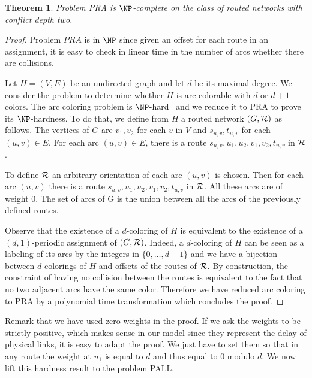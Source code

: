 \documentclass[10pt, conference, letterpaper]{IEEEtran}
\newtheorem{theorem}{Theorem}
\begin{document}
 \begin{theorem}
Problem PRA is $\NP$-complete on the class of routed networks with conflict depth two.
\end{theorem}
 \begin{proof}
 Problem $PRA$ is in $\NP$ since given an offset for each route in an assignment, it is easy to check in linear time in the number of arcs whether there are collisions.
 
  Let $H=(V,E)$ be an undirected graph and let $d$ be its maximal degree. We consider the problem to determine whether $H$ is arc-colorable
  with $d$ or $d+1$ colors. The arc coloring problem is $\NP$-hard~\cite{holyer1981np} and we reduce it to PRA to prove its $\NP$-hardness. To do that, we define from $H$ a routed network $(G,{\cal R})$ as follows.
  The vertices of $G$ are $v_1, v_2$ for each $v$ in $V$ and $s_{u,v}, t_{u,v}$ for each $(u,v) \in E$.
  For each arc $(u,v) \in E$, there is a route $s_{u,v},u_1,u_2,v_1,v_2,t_{u,v}$ in ${\cal R}$. 
  
   To define ${\cal R}$ an arbitrary orientation of each arc $(u,v)$ is chosen. 
   Then for each arc $(u,v)$ there is a route $s_{u,v},u_1,u_2,v_1,v_2,t_{u,v}$ in ${\cal R}$.
  All these arcs are of weight $0$. The set of arcs of G is the union between all the arcs of the previously defined routes.
   
    
  Observe that the existence of a $d$-coloring of $H$ is equivalent to the existence of a $(d,1)$-periodic assignment
  of $(G,{\cal R})$. Indeed, a $d$-coloring of $H$ can be seen as a labeling of its arcs by the integers
  in $\{0,\dots,d-1\}$ and we have a bijection between $d$-colorings of $H$ and offsets of the routes of ${\cal R}$.
  By construction, the constraint of having no collision between the routes is equivalent to the fact that no two adjacent arcs have the same color. Therefore we have reduced arc coloring to PRA by a polynomial time transformation which concludes the proof. 
 \end{proof}
 
 Remark that we have used zero weights in the proof. If we ask the weights to be strictly positive, which makes sense in our model since
they represent the delay of physical links, it is easy to adapt the proof. We just have to set them so that in any route the weight at $u_1$ is equal to $d$ and thus equal to $0$ modulo $d$. We now lift this hardness result to the problem PALL.
\end{document}
